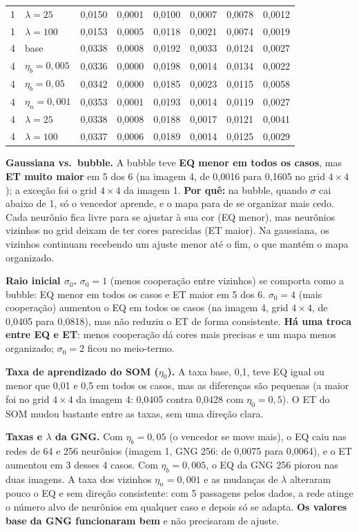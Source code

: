 \documentclass[11pt,a4paper]{article}
\begin{document}
\begin{table}[H]
\begin{tabular}{llcccccc}
1 & $\lambda = 25$ & 0,0150 & 0,0001 & 0,0100 & 0,0007 & 0,0078 & 0,0012 \\
1 & $\lambda = 100$ & 0,0153 & 0,0005 & 0,0118 & 0,0021 & 0,0074 & 0,0019 \\
4 & base & 0,0338 & 0,0008 & 0,0192 & 0,0033 & 0,0124 & 0,0027 \\
4 & $\eta_b = 0{,}005$ & 0,0336 & 0,0000 & 0,0198 & 0,0014 & 0,0134 & 0,0022 \\
4 & $\eta_b = 0{,}05$ & 0,0342 & 0,0000 & 0,0185 & 0,0023 & 0,0115 & 0,0058 \\
4 & $\eta_n = 0{,}001$ & 0,0353 & 0,0001 & 0,0193 & 0,0014 & 0,0119 & 0,0027 \\
4 & $\lambda = 25$ & 0,0338 & 0,0008 & 0,0188 & 0,0017 & 0,0121 & 0,0041 \\
4 & $\lambda = 100$ & 0,0337 & 0,0006 & 0,0189 & 0,0014 & 0,0125 & 0,0029 \\
\bottomrule
\end{tabular}
\end{table}

\textbf{Gaussiana vs.\ bubble.} A bubble teve \textbf{EQ menor em todos os casos}, mas \textbf{ET muito maior} em 5 dos 6 (na imagem 4, de 0,0016 para 0,1605 no grid $4\times4$); a exceção foi o grid $4\times4$ da imagem 1. \textbf{Por quê:} na bubble, quando $\sigma$ cai abaixo de 1, só o vencedor aprende, e o mapa para de se organizar mais cedo. Cada neurônio fica livre para se ajustar à sua cor (EQ menor), mas neurônios vizinhos no grid deixam de ter cores parecidas (ET maior). Na gaussiana, os vizinhos continuam recebendo um ajuste menor até o fim, o que mantém o mapa organizado.

\textbf{Raio inicial $\sigma_0$.} $\sigma_0 = 1$ (menos cooperação entre vizinhos) se comporta como a bubble: EQ menor em todos os casos e ET maior em 5 dos 6. $\sigma_0 = 4$ (mais cooperação) aumentou o EQ em todos os casos (na imagem 4, grid $4\times4$, de 0,0405 para 0,0818), mas não reduziu o ET de forma consistente. \textbf{Há uma troca entre EQ e ET}: menos cooperação dá cores mais precisas e um mapa menos organizado; $\sigma_0 = 2$ ficou no meio-termo.

\textbf{Taxa de aprendizado do SOM ($\eta_0$).} A taxa base, 0,1, teve EQ igual ou menor que 0,01 e 0,5 em todos os casos, mas as diferenças são pequenas (a maior foi no grid $4\times4$ da imagem 4: 0,0405 contra 0,0428 com $\eta_0 = 0{,}5$). O ET do SOM mudou bastante entre as taxas, sem uma direção clara.

\textbf{Taxas e $\lambda$ da GNG.} Com $\eta_b = 0{,}05$ (o vencedor se move mais), o EQ caiu nas redes de 64 e 256 neurônios (imagem 1, GNG 256: de 0,0075 para 0,0064), e o ET aumentou em 3 desses 4 casos. Com $\eta_b = 0{,}005$, o EQ da GNG 256 piorou nas duas imagens. A taxa dos vizinhos $\eta_n = 0{,}001$ e as mudanças de $\lambda$ alteraram pouco o EQ e sem direção consistente: com 5 passagens pelos dados, a rede atinge o número alvo de neurônios em qualquer caso e depois só se adapta. \textbf{Os valores base da GNG funcionaram bem} e não precisaram de ajuste.
\end{document}
